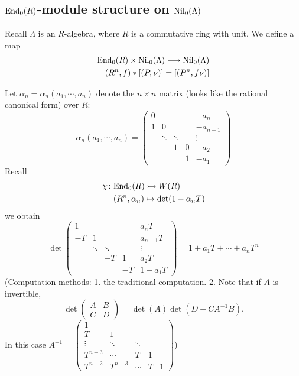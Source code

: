 %
%
\subsection{$\mathrm{End}_0(R)$-module structure on $\mathrm{Nil}_0(\Lambda)$}
Recall $\Lambda$ is an $R$-algebra, where $R$ is a commutative ring with unit. We define a map
\begin{align*}
	\mathrm{End}_0(R)\times \mathrm{Nil}_0(\Lambda) \longrightarrow \mathrm{Nil}_0(\Lambda) \\
	(R^n,f)*[(P,\nu)]=[(P^n,f\nu)]
\end{align*}

Let $\alpha_n=\alpha_n(a_1,\cdots,a_n)$ denote the $n\times n$ matrix (looks like the rational canonical form) over $R$:
\[\alpha_n(a_1,\cdots,a_n)=\begin{pmatrix}
	0& & & & -a_n\\
	1&0& & & -a_{n-1}\\
	 &\ddots&\ddots& &\vdots\\
	 & & 1&0&-a_2\\
	 & & & 1&-a_1 
\end{pmatrix}\]
Recall
\begin{align*}
	\chi \colon&  \mathrm{End}_0(R)\rightarrowtail W(R) \\
	 & (R^n,\alpha_n) \mapsto \det(1-\alpha_n T)
\end{align*}
we obtain
\[\det \begin{pmatrix}
	1& & & & a_n T\\
	-T&1& & & a_{n-1} T\\
	 &\ddots&\ddots& &\vdots\\
	 & & -T&1&a_2 T\\
	 & & & -T&1+a_1 T 
\end{pmatrix}=1+a_1T+\cdots+a_nT^n\]
(Computation methods: 1. the traditional computation. 2. Note that if $A$ is invertible,
\[\det \begin{pmatrix}
	A &B \\ C& D
\end{pmatrix} =\det(A)\det(D-CA^{-1}B).\]
In this case $A^{-1}=\begin{pmatrix}
	1& & & & \\
	T&1& & & \\
	 \vdots&\ddots&\ddots& &\\
	 T^{n-3}& \cdots& T&1&\\
	 T^{n-2}&T^{n-3} &\cdots & T&1 
\end{pmatrix}$)

